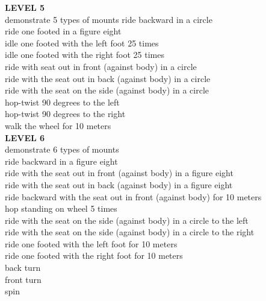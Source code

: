\textbf{LEVEL 5}\\
demonstrate 5 types of mounts ride backward in a circle\\
ride one footed in a figure eight\\
idle one footed with the left foot 25 times\\
idle one footed with the right foot 25 times\\
ride with seat out in front (against body) in a circle\\
ride with the seat out in back (against body) in a circle\\
ride with the seat on the side (against body) in a circle\\
hop-twist 90 degrees to the left\\
hop-twist 90 degrees to the right\\
walk the wheel for 10 meters \\
\textbf{LEVEL 6}\\
demonstrate 6 types of mounts\\
ride backward in a figure eight\\
ride with the seat out in front (against body) in a figure eight\\
ride with the seat out in back (against body) in a figure eight\\
ride backward with the seat out in front (against body) for 10 meters\\
hop standing on wheel 5 times\\
ride with the seat on the side (against body) in a circle to the left\\
ride with the seat on the side (against body) in a circle to the right\\
ride one footed with the left foot for 10 meters\\
ride one footed with the right foot for 10 meters\\
back turn\\
front turn\\
spin \\
